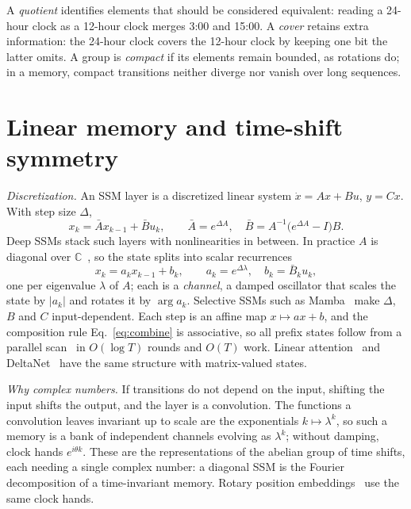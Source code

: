 \documentclass[aps,prx,reprint,superscriptaddress,longbibliography,nofootinbib,floatfix]{revtex4-2}
\newcommand{\CC}{\mathbb{C}}
\theoremstyle{plain}
\theoremstyle{definition}
\begin{document}
A \emph{quotient} identifies elements that should be considered equivalent:
reading a 24-hour clock as a 12-hour clock merges 3:00 and 15:00. A
\emph{cover} retains extra information: the 24-hour clock covers the
12-hour clock by keeping one bit the latter omits. A group is
\emph{compact} if its elements remain bounded, as rotations do; in a memory,
compact transitions neither diverge nor vanish over long sequences.

\section{Linear memory and time-shift symmetry}\label{sm:linear}

\emph{Discretization.} An SSM layer is a discretized linear system
$\dot x = Ax + Bu$, $y = Cx$. With step size $\Delta$,
\begin{equation}
x_k = \bar A x_{k-1} + \bar B u_k,\qquad
\bar A = e^{\Delta A},\quad \bar B = A^{-1}\bigl(e^{\Delta A}-I\bigr)B.
\label{eq:ssm}
\end{equation}
Deep SSMs stack such layers with nonlinearities in between. In practice $A$
is diagonal over $\CC$~\cite{gu_s4d,orvieto_lru}, so the state splits into
scalar recurrences
\begin{equation}
x_k = a_k x_{k-1} + b_k, \qquad a_k = e^{\Delta\lambda},\quad b_k=\bar B_k u_k,
\label{eq:scalar}
\end{equation}
one per eigenvalue $\lambda$ of $A$; each is a \emph{channel}, a damped
oscillator that scales the state by $|a_k|$ and rotates it by $\arg a_k$.
Selective SSMs such as Mamba~\cite{gu_mamba,dao_mamba2} make $\Delta$, $B$
and $C$ input-dependent. Each step is an affine map $x\mapsto ax+b$, and the
composition rule Eq.~\eqref{eq:combine} is associative, so all prefix states
follow from a parallel scan~\cite{blelloch,martin_cundy} in $O(\log T)$
rounds and $O(T)$ work. Linear attention~\cite{katharopoulos} and
DeltaNet~\cite{yang_deltanet} have the same structure with matrix-valued
states.

\emph{Why complex numbers.} If transitions do not depend on the input,
shifting the input shifts the output, and the layer is a convolution. The
functions a convolution leaves invariant up to scale are the exponentials
$k\mapsto\lambda^k$, so such a memory is a bank of independent channels
evolving as $\lambda^k$; without damping, clock hands $e^{i\theta k}$. These
are the representations of the abelian group of time shifts, each needing a
single complex number: a diagonal SSM is the Fourier decomposition of a
time-invariant memory. Rotary position embeddings~\cite{su_roformer} use the
same clock hands.
\end{document}
